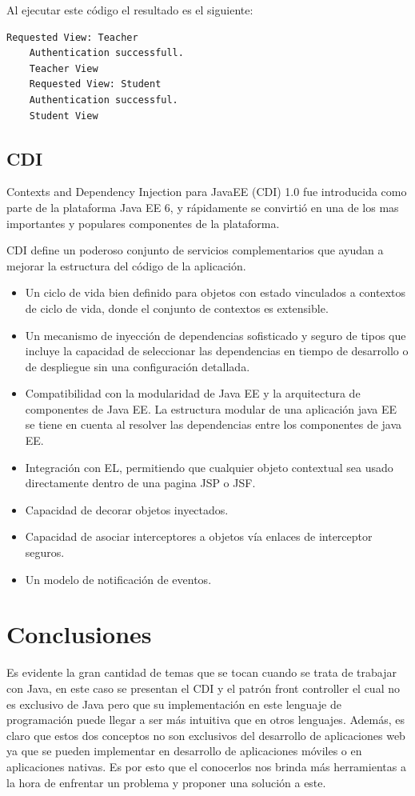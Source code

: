\documentclass[a4paper,12pt]{article}
\begin{document}
Al ejecutar este código el resultado es el siguiente:

\begin{lstlisting}[language=bash]
    Requested View: Teacher
    Authentication successfull.
    Teacher View
    Requested View: Student
    Authentication successful.
    Student View
\end{lstlisting}

\subsection{CDI}
Contexts and Dependency Injection para JavaEE (CDI) 1.0 fue introducida como 
parte de la plataforma Java EE 6, y rápidamente se convirtió en una de los mas 
importantes y populares componentes de la plataforma.

CDI define un poderoso conjunto de servicios complementarios que ayudan a 
mejorar la estructura del código de la aplicación.

\begin{itemize}
 \item Un ciclo de vida bien definido para objetos con estado vinculados a 
contextos de ciclo de vida, donde el conjunto de contextos es extensible.
\item Un mecanismo de inyección de dependencias sofisticado y seguro de tipos 
que incluye la capacidad de seleccionar las dependencias en tiempo de 
desarrollo o de despliegue sin una configuración detallada.
\item Compatibilidad con la modularidad de Java EE y la arquitectura de 
componentes de Java EE. La estructura modular de una aplicación java EE se 
tiene en cuenta al resolver las dependencias entre los componentes de java EE.
\item Integración con EL, permitiendo que cualquier objeto contextual sea usado 
directamente dentro de una pagina JSP o JSF.
\item Capacidad de decorar objetos inyectados.
\item Capacidad de asociar interceptores a objetos vía enlaces de interceptor 
seguros.
\item Un modelo de notificación de eventos.
\end{itemize}

\section{Conclusiones}
Es evidente la gran cantidad de temas que se tocan cuando se trata de trabajar 
con Java, en este caso se presentan el CDI y el patrón front controller el cual 
no es exclusivo de Java pero que su implementación en este lenguaje de 
programación puede llegar a ser más intuitiva que en otros lenguajes. Además, 
es claro que estos dos conceptos no son exclusivos del desarrollo de 
aplicaciones web ya que se pueden implementar en desarrollo de aplicaciones 
móviles o en aplicaciones nativas. Es por esto que el conocerlos nos brinda más 
herramientas a la hora de enfrentar un problema y proponer una solución a este.
\end{document}
